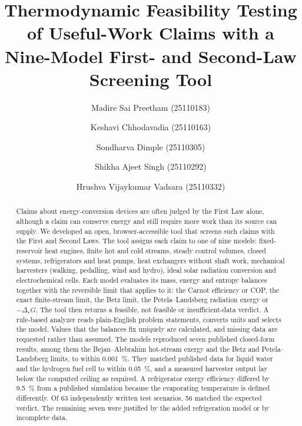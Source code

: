 \documentclass[journal=iecred,manuscript=article,layout=twocolumn,email=false]{achemso}
\author{Madire Sai Preetham (25110183)}
\author{Keshavi Chhodavadia (25110163)}
\author{Sondharva Dimple (25110305)}
\author{Shikha Ajeet Singh (25110292)}
\author{Hrushva Vijaykumar Vadsara (25110332)}
\affiliation[IIT Gandhinagar]{CL 202 Group IA, Department of Chemical Engineering, Indian Institute of Technology
Gandhinagar, Palaj, Gandhinagar 382355, Gujarat, India}
\title{Thermodynamic Feasibility Testing of Useful-Work Claims with a Nine-Model First- and Second-Law Screening Tool}
\begin{document}
\begin{abstract}
Claims about energy-conversion devices are often judged by the First Law alone, although a claim can conserve
energy and still require more work than its source can supply. We developed an open, browser-accessible tool that
screens such claims with the First and Second Laws. The tool assigns each claim to one of nine models: fixed-reservoir
heat engines, finite hot and cold streams, steady control volumes, closed systems, refrigerators and heat pumps,
heat exchangers without shaft work, mechanical harvesters (walking, pedalling, wind and hydro), ideal solar
radiation conversion and electrochemical cells. Each model evaluates its mass, energy and entropy balances together
with the reversible limit that applies to it: the Carnot efficiency or COP, the exact finite-stream limit, the Betz
limit, the Petela--Landsberg radiation exergy or $-\Delta_rG$. The tool then returns a feasible, not feasible or
insufficient-data verdict. A rule-based analyzer reads plain-English problem statements, converts units and selects
the model. Values that the balances fix uniquely are calculated, and missing data are requested rather than assumed.
The models reproduced seven published closed-form results, among them the Bejan--Alebrahim hot-stream exergy and the
Betz and Petela--Landsberg limits, to within \SI{0.001}{\percent}. They matched published data for liquid water and
the hydrogen fuel cell to within \SI{0.05}{\percent}, and a measured harvester output lay below the computed ceiling as
required. A refrigerator exergy efficiency differed by \SI{9.5}{\percent} from a published simulation because the
evaporating temperature is defined differently. Of 63 independently written test scenarios, 56 matched the
expected verdict. The remaining seven were justified by the added refrigeration model or by incomplete data.
\end{abstract}

\end{document}
